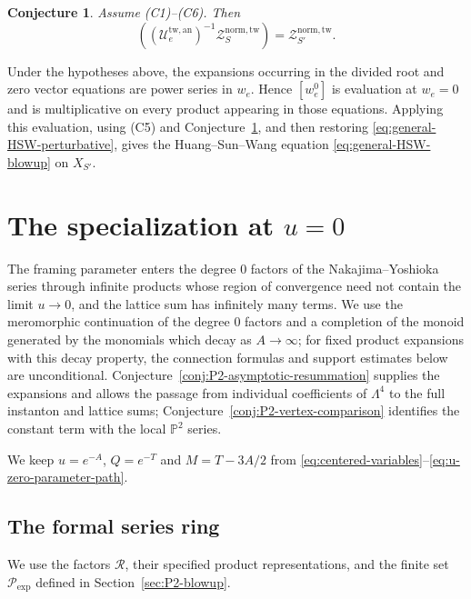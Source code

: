 \documentclass{amsart}
\newtheorem{conjecture}{Conjecture}
\theoremstyle{definition}
\numberwithin{equation}{section}
\begin{document}
\begin{conjecture}
\label{conj:rational-elliptic-contraction}
Assume \textup{(C1)--(C6)}.  Then
\begin{equation}
 [w_e^0]\left((\mathcal U_e^{\mathrm{tw,an}})^{-1}
 \mathcal Z_S^{\mathrm{norm,tw}}\right)
 =\mathcal Z_{S'}^{\mathrm{norm,tw}}.
\label{eq:stable-pair-contraction-conjecture}
\end{equation}
\end{conjecture}

Under the hypotheses above, the expansions occurring in the divided root and zero vector equations are power series in \(w_e\).  Hence \([w_e^0]\) is evaluation at \(w_e=0\) and is multiplicative on every product appearing in those equations.  Applying this evaluation, using \textup{(C5)} and Conjecture~\ref{conj:rational-elliptic-contraction}, and then restoring \eqref{eq:general-HSW-perturbative}, gives the Huang--Sun--Wang equation \eqref{eq:general-HSW-blowup} on \(X_{S'}\).

\appendix
\section{The specialization at \texorpdfstring{\(u=0\)}{u=0}}
\label{app:u-zero}

The framing parameter enters the degree \(0\) factors of the Nakajima--Yoshioka series through infinite products whose region of convergence need not contain the limit \(u\to0\), and the lattice sum has infinitely many terms.  We use the meromorphic continuation of the degree \(0\) factors and a completion of the monoid generated by the monomials which decay as \(A\to\infty\); for fixed product expansions with this decay property, the connection formulas and support estimates below are unconditional.  Conjecture~\ref{conj:P2-asymptotic-resummation} supplies the expansions and allows the passage from individual coefficients of \(\Lambda^4\) to the full instanton and lattice sums; Conjecture~\ref{conj:P2-vertex-comparison} identifies the constant term with the local \(\mathbb P^2\) series.

We keep \(u=e^{-A}\), \(Q=e^{-T}\) and \(M=T-3A/2\) from \eqref{eq:centered-variables}--\eqref{eq:u-zero-parameter-path}.

\subsection{The formal series ring}
We use the factors \(\mathcal R\), their specified product representations, and the finite set \(\mathcal P_{\mathrm{exp}}\) defined in Section~\ref{sec:P2-blowup}.
\end{document}
